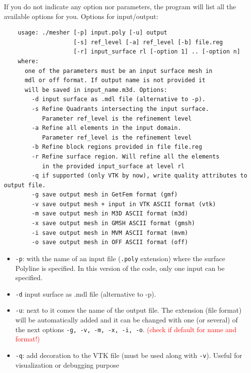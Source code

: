 \documentclass[10pt]{article}
\begin{document}
If you do not indicate any option nor parameters, the program will list all the available options for you. Options for input/output:
\begin{tcolorbox}
{\small
\begin{verbatim}
    usage: ./mesher [-p] input.poly [-u] output
                    [-s] ref_level [-a] ref_level [-b] file.reg
                    [-r] input_surface rl [-option 1] .. [-option n]
    where:
      one of the parameters must be an input surface mesh in
      mdl or off format. If output name is not provided it
      will be saved in input_name.m3d. Options:
        -d input surface as .mdl file (alternative to -p).
        -s Refine Quadrants intersecting the input surface.
           Parameter ref_level is the refinement level
        -a Refine all elements in the input domain.
           Parameter ref_level is the refinement level
        -b Refine block regions provided in file file.reg
        -r Refine surface region. Will refine all the elements
           in the provided input_surface at level rl
        -q if supported (only VTK by now), write quality attributes to output file.
        -g save output mesh in GetFem format (gmf)
        -v save output mesh + input in VTK ASCII format (vtk)
        -m save output mesh in M3D ASCII format (m3d)
        -x save output mesh in GMSH ASCII format (gmsh)
        -i save output mesh in MVM ASCII format (mvm)
        -o save output mesh in OFF ASCII format (off)
\end{verbatim}
}\end{tcolorbox}


\begin{itemize}
\item \texttt{-p}: with the name of an input file (\texttt{.poly} extension) where the surface Polyline is specified. In this version of the code, only one input can be specified.
\item  \texttt{-d} input surface as .mdl file (alternative to -p).
\item \texttt{-u}: next to it comes the name of the output file. The extension (file format) will be automatically added and  it can be changed with one (or several) of  the next options \texttt{-g, -v, -m, -x, -i, -o}. \textcolor{red}{(check if default for  name and format!)}
\item \texttt{-q}: add decoration to the VTK file (must be used along with \texttt{-v}). Useful for visualization or debugging purpose
\end{itemize}
\end{document}
